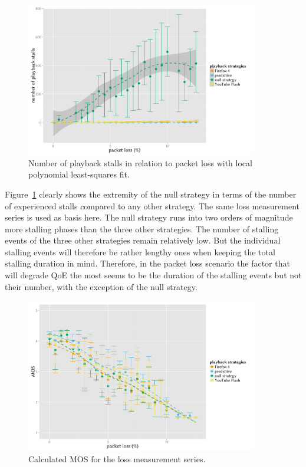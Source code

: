 \begin{figure}[htbp]
	\centering
	\includegraphics[width=0.9\textwidth]{images/R-playbackemulation-stallnumber-loss.pdf}
	\caption{Number of playback stalls in relation to packet loss with local polynomial least-squares fit.}
\label{c3:fig:eval-loss-numstalls}
\end{figure}

Figure~\ref{c3:fig:eval-loss-numstalls} clearly shows the extremity of the null strategy in terms of the number of experienced stalls compared to any other strategy. The same loss measurement series is used as basis here. The null strategy runs into two orders of magnitude more stalling phases than the three other strategies. The number of stalling events of the three other strategies remain relatively low. But the individual stalling events will therefore be rather lengthy ones when keeping the total stalling duration in mind. Therefore, in the packet loss scenario the factor that will degrade \gls{QoE} the most seems to be the duration of the stalling events but not their number, with the exception of the null strategy.

\begin{figure}[htb]
	\centering
	\includegraphics[width=0.9\textwidth]{images/R-playbackemulation-qoe-loss.pdf}
	\caption{Calculated \acrshort{MOS} for the loss measurement series.}
\label{c3:fig:eval-loss-qoe}
\end{figure}

